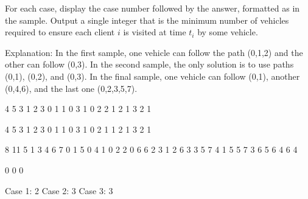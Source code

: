 \documentclass{article}
\begin{document}
\begin{outputDescription}
For each case, display the case number followed by the answer, formatted as in the
sample.  Output a single integer that is the minimum number of vehicles required 
to ensure each client $i$ is visited at time $t_{i}$ by some vehicle.

Explanation: 
In the first sample, one vehicle can follow the path (0,1,2) and the other can 
follow (0,3). In the second sample, the only solution is to use paths (0,1), 
(0,2), and (0,3). In the final sample, one vehicle can follow (0,1), another 
(0,4,6), and the last one (0,2,3,5,7).  
\end{outputDescription}

\begin{sampleInput}
4 5 3
1 2 3
0 1 1
0 3 1
0 2 2
1 2 1
3 2 1

4 5 3
1 2 3
0 1 1
0 3 1
0 2 1
1 2 1
3 2 1

8 11 5
1 3 4 6 7
0 1 5
0 4 1
0 2 2
0 6 6
2 3 1
2 6 3
3 5 7
4 1 5
5 7 3
6 5 6
4 6 4

0 0 0
\end{sampleInput}
\begin{sampleOutput}
Case 1: 2
Case 2: 3
Case 3: 3
\end{sampleOutput}
\end{document}
